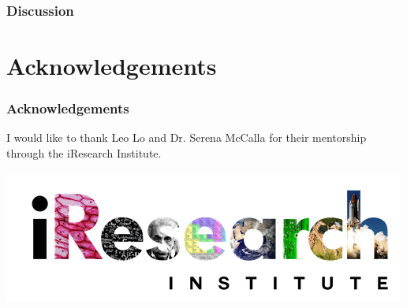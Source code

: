 \documentclass[12pt]{beamer}
\begin{document}
\begin{frame}
\frametitle{Discussion}

\end{frame}

\section{Acknowledgements}


\begin{frame}
\frametitle{Acknowledgements}
I would like to thank Leo Lo and Dr. Serena McCalla for their mentorship through the iResearch Institute.

\includegraphics[scale = 0.55]{iresearch.png}


\end{frame}
\end{document}
